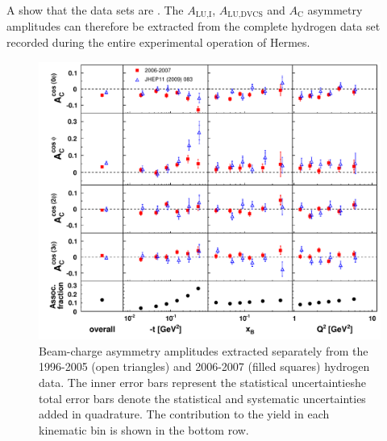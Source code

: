 A  show that the  data sets are . The $A_{\textrm{LU,I}}$, $A_{\textrm{LU,DVCS}}$ and $A_{\textrm{C}}$ asymmetry amplitudes can therefore be extracted from the complete hydrogen data set recorded during the entire experimental operation of H{\sc ermes}.
\begin{figure}
\begin{center}
 \includegraphics[width=15cm,keepaspectratio]{bcaplots_eml_par13_bin6_release_pic_update_0607_9605_withassoc}
  \caption{Beam-charge asymmetry amplitudes extracted separately from the 1996-2005 (open triangles) and 2006-2007 (filled squares) hydrogen data.
The inner error bars represent the statistical uncertaintieshe total error bars denote the statistical and systematic uncertainties added in quadrature. The  contribution  to the yield in each kinematic bin is shown in the bottom row.}
 \label{release_bca_0607}
\end{center}
 \end{figure}

